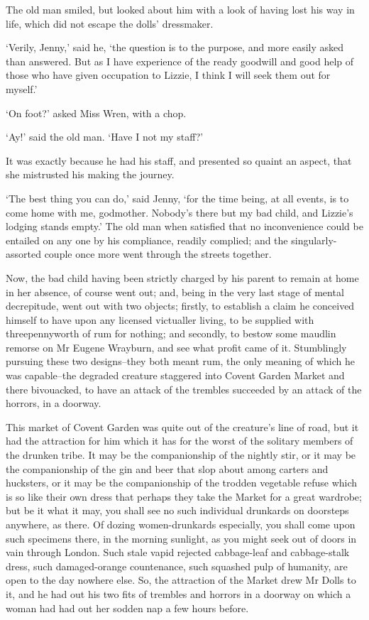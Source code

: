 The old man smiled, but looked about him with a look of having lost his
way in life, which did not escape the dolls’ dressmaker.

‘Verily, Jenny,’ said he, ‘the question is to the purpose, and more
easily asked than answered. But as I have experience of the ready
goodwill and good help of those who have given occupation to Lizzie, I
think I will seek them out for myself.’

‘On foot?’ asked Miss Wren, with a chop.

‘Ay!’ said the old man. ‘Have I not my staff?’

It was exactly because he had his staff, and presented so quaint an
aspect, that she mistrusted his making the journey.

‘The best thing you can do,’ said Jenny, ‘for the time being, at all
events, is to come home with me, godmother. Nobody’s there but my bad
child, and Lizzie’s lodging stands empty.’ The old man when satisfied
that no inconvenience could be entailed on any one by his compliance,
readily complied; and the singularly-assorted couple once more went
through the streets together.

Now, the bad child having been strictly charged by his parent to remain
at home in her absence, of course went out; and, being in the very last
stage of mental decrepitude, went out with two objects; firstly,
to establish a claim he conceived himself to have upon any licensed
victualler living, to be supplied with threepennyworth of rum for
nothing; and secondly, to bestow some maudlin remorse on Mr Eugene
Wrayburn, and see what profit came of it. Stumblingly pursuing these
two designs--they both meant rum, the only meaning of which he was
capable--the degraded creature staggered into Covent Garden Market and
there bivouacked, to have an attack of the trembles succeeded by an
attack of the horrors, in a doorway.

This market of Covent Garden was quite out of the creature’s line of
road, but it had the attraction for him which it has for the worst of
the solitary members of the drunken tribe. It may be the companionship
of the nightly stir, or it may be the companionship of the gin and
beer that slop about among carters and hucksters, or it may be the
companionship of the trodden vegetable refuse which is so like their own
dress that perhaps they take the Market for a great wardrobe; but be
it what it may, you shall see no such individual drunkards on doorsteps
anywhere, as there. Of dozing women-drunkards especially, you shall come
upon such specimens there, in the morning sunlight, as you might
seek out of doors in vain through London. Such stale vapid rejected
cabbage-leaf and cabbage-stalk dress, such damaged-orange countenance,
such squashed pulp of humanity, are open to the day nowhere else. So,
the attraction of the Market drew Mr Dolls to it, and he had out his two
fits of trembles and horrors in a doorway on which a woman had had out
her sodden nap a few hours before.

